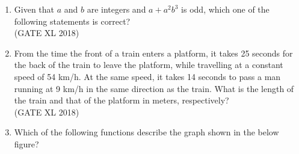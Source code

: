 \documentclass[14pt]{extarticle}
\begin{document}
\begin{flushleft}
\begin{enumerate}
\item Given that $a$ and $b$ are integers and $a + a^2 b^3$ is odd, which one of the following statements is correct?\\
\hfill(GATE XL 2018)\\
\begin{enumerate}[label=(\Alph*)]
\end{enumerate}

\item From the time the front of a train enters a platform, it takes 25 seconds for the back of the train to leave the platform, while travelling at a constant speed of 54 km/h. At the same speed, it takes 14 seconds to pass a man running at 9 km/h in the same direction as the train. What is the length of the train and that of the platform in meters, respectively?\\
\hfill(GATE XL 2018)\\
\begin{enumerate}[label=(\Alph*)]
\end{enumerate}

\item Which of the following functions describe the graph shown in the below figure?\\
\begin{center}
    

\end{center}
\end{enumerate}
\end{flushleft}
\end{document}
